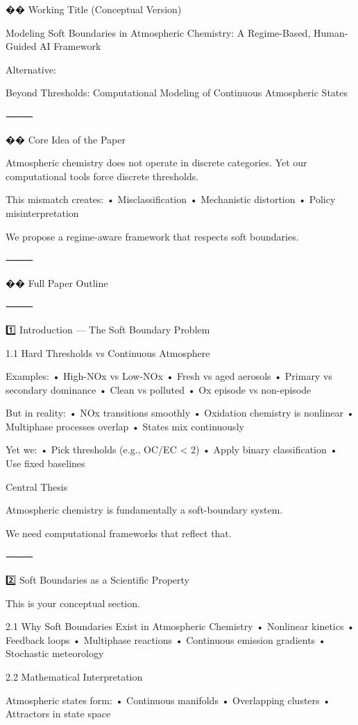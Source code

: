 �� Working Title (Conceptual Version)

Modeling Soft Boundaries in Atmospheric Chemistry: A Regime-Based, Human-Guided AI Framework

Alternative:

Beyond Thresholds: Computational Modeling of Continuous Atmospheric States

⸻

�� Core Idea of the Paper

Atmospheric chemistry does not operate in discrete categories.
Yet our computational tools force discrete thresholds.

This mismatch creates:
	•	Misclassification
	•	Mechanistic distortion
	•	Policy misinterpretation

We propose a regime-aware framework that respects soft boundaries.

⸻

�� Full Paper Outline

⸻

1️⃣ Introduction — The Soft Boundary Problem

1.1 Hard Thresholds vs Continuous Atmosphere

Examples:
	•	High-NOx vs Low-NOx
	•	Fresh vs aged aerosols
	•	Primary vs secondary dominance
	•	Clean vs polluted
	•	Ox episode vs non-episode

But in reality:
	•	NOx transitions smoothly
	•	Oxidation chemistry is nonlinear
	•	Multiphase processes overlap
	•	States mix continuously

Yet we:
	•	Pick thresholds (e.g., OC/EC < 2)
	•	Apply binary classification
	•	Use fixed baselines

Central Thesis

Atmospheric chemistry is fundamentally a soft-boundary system.

We need computational frameworks that reflect that.

⸻

2️⃣ Soft Boundaries as a Scientific Property

This is your conceptual section.

2.1 Why Soft Boundaries Exist in Atmospheric Chemistry
	•	Nonlinear kinetics
	•	Feedback loops
	•	Multiphase reactions
	•	Continuous emission gradients
	•	Stochastic meteorology

2.2 Mathematical Interpretation

Atmospheric states form:
	•	Continuous manifolds
	•	Overlapping clusters
	•	Attractors in state space

